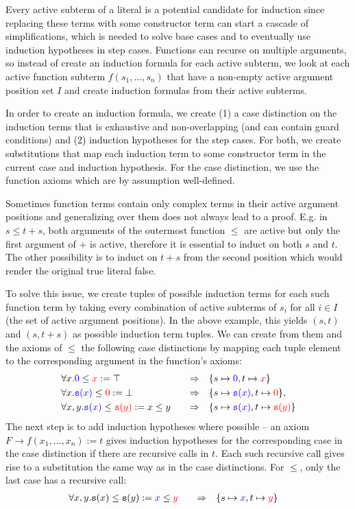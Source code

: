 Every active subterm of a literal is a potential candidate for induction since replacing these terms with some constructor term can start a cascade of simplifications, which is needed to solve base cases and to eventually use induction hypotheses in step cases. Functions can recurse on multiple arguments, so instead of create an induction formula for each active subterm, we look at each active function subterm $f(s_1,...,s_n)$ that have a non-empty active argument position set $I$ and create induction formulas from their active subterms.

In order to create an induction formula, we create (1) a case distinction on the induction terms that is exhaustive and non-overlapping (and can contain guard conditions) and (2) induction hypotheses for the step cases. For both, we create substitutions that map each induction term to some constructor term in the current case and induction hypothesis. For the case distinction, we use the function axioms which are by assumption well-defined.

Sometimes function terms contain only complex terms in their active argument positions and generalizing over them does not always lead to a proof. E.g. in $s\leq t+s$, both arguments of the outermost function $\leq$ are active but only the first argument of $+$ is active, therefore it is essential to induct on both $s$ and $t$. The other possibility is to induct on $t+s$ from the second position which would render the original true literal false.

To solve this issue, we create tuples of possible induction terms for each such function term by taking every combination of active subterms of $s_i$ for all $i\in I$ (the set of active argument positions). In the above example, this yields $(s,t)$ and $(s,t+s)$ as possible induction term tuples. We can create from them and the axioms of $\leq$ the following case distinctions by mapping each tuple element to the corresponding argument in the function's axioms:
$$\begin{aligned}
&\forall x.\textcolor{blue}{0}\leq \textcolor{red}{x}:=\top\quad&\Rightarrow\quad&\{s\mapsto \textcolor{blue}{0}, t\mapsto \textcolor{red}{x}\}\\
&\forall x.\textcolor{blue}{\mathtt{s}(x)}\leq \textcolor{red}{0}:=\bot\quad&\Rightarrow\quad&\{s\mapsto \textcolor{blue}{\mathtt{s}(x)}, t\mapsto \textcolor{red}{0}\},\\
&\forall x,y.\textcolor{blue}{\mathtt{s}(x)}\leq \textcolor{red}{\mathtt{s}(y)}:=x\leq y\quad&\Rightarrow\quad&\{s\mapsto \textcolor{blue}{\mathtt{s}(x)}, t\mapsto \textcolor{red}{\mathtt{s}(y)}\}
\end{aligned}$$
The next step is to add induction hypotheses where possible -- an axiom $F\rightarrow f(x_1,...,x_n):=t$ gives induction hypotheses for the corresponding case in the case distinction if there are recursive calls in $t$. Each such recursive call gives rise to a substitution the same way as in the case distinctions. For $\leq$, only the last case has a recursive call:
$$\begin{aligned}
&\forall x,y.\mathtt{s}(x)\leq \mathtt{s}(y):=\textcolor{blue}{x}\leq \textcolor{red}{y}\quad&\Rightarrow\quad&\{s\mapsto \textcolor{blue}{x}, t\mapsto \textcolor{red}{y}\}
\end{aligned}$$


